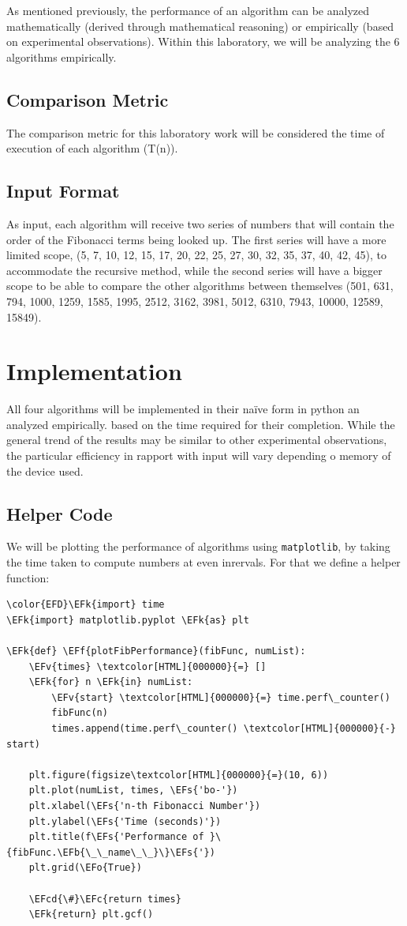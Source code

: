 \documentclass[a4paper,12pt]{article}
\newcommand{\EFc}[1]{\textcolor{EFc}{#1}} %
\newcommand{\EFcd}[1]{\textcolor{EFcd}{#1}} %
\newcommand{\EFs}[1]{\textcolor{EFs}{#1}} %
\newcommand{\EFk}[1]{\textcolor{EFk}{#1}} %
\newcommand{\EFb}[1]{\textcolor{EFb}{#1}} %
\newcommand{\EFf}[1]{\textcolor{EFf}{#1}} %
\newcommand{\EFv}[1]{\textcolor{EFv}{#1}} %
\newcommand{\EFo}[1]{\textcolor{EFo}{#1}} %
\begin{document}
As mentioned previously, the performance of an algorithm can be analyzed mathematically
(derived through mathematical reasoning) or empirically (based on experimental observations).
Within this laboratory, we will be analyzing the 6 algorithms empirically.
\subsection{Comparison Metric}
\label{sec:org6dc4706}
The comparison metric for this laboratory work will be considered the time of execution of each algorithm (T(n)).
\subsection{Input Format}
\label{sec:org0d10d57}
As input, each algorithm will receive two series of numbers that will contain the order of the
Fibonacci terms being looked up. The first series will have a more limited scope, (5, 7, 10, 12, 15, 17, 20,
22, 25, 27, 30, 32, 35, 37, 40, 42, 45), to accommodate the recursive method, while the second series will
have a bigger scope to be able to compare the other algorithms between themselves (501, 631, 794, 1000,
1259, 1585, 1995, 2512, 3162, 3981, 5012, 6310, 7943, 10000, 12589, 15849).
\section{Implementation}
\label{sec:org3069a46}
All four algorithms will be implemented in their naïve form in python an analyzed empirically.
based on the time required for their completion. While the general trend of the results may be similar to
other experimental observations, the particular efficiency in rapport with input will vary depending o
memory of the device used.
\subsection{Helper Code}
\label{sec:org6dc8595}
We will be plotting the performance of algorithms using \texttt{matplotlib}, by taking the time taken to compute numbers at even inrervals. For that we define a helper function:
\begin{Code}
\begin{Verbatim}
\color{EFD}\EFk{import} time
\EFk{import} matplotlib.pyplot \EFk{as} plt

\EFk{def} \EFf{plotFibPerformance}(fibFunc, numList):
    \EFv{times} \textcolor[HTML]{000000}{=} []
    \EFk{for} n \EFk{in} numList:
        \EFv{start} \textcolor[HTML]{000000}{=} time.perf\_counter()
        fibFunc(n)
        times.append(time.perf\_counter() \textcolor[HTML]{000000}{-} start)

    plt.figure(figsize\textcolor[HTML]{000000}{=}(10, 6))
    plt.plot(numList, times, \EFs{'bo-'})
    plt.xlabel(\EFs{'n-th Fibonacci Number'})
    plt.ylabel(\EFs{'Time (seconds)'})
    plt.title(f\EFs{'Performance of }\{fibFunc.\EFb{\_\_name\_\_}\}\EFs{'})
    plt.grid(\EFo{True})

    \EFcd{\#}\EFc{return times}
    \EFk{return} plt.gcf()
\end{Verbatim}
\end{Code}
\end{document}
